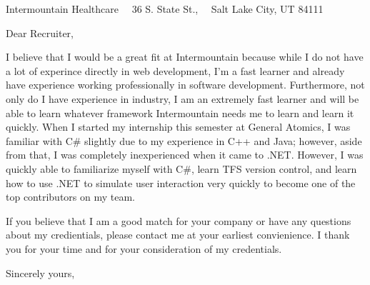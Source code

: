 \documentclass{scrlttr2}
\renewcommand{\\}{\ {\large\textperiodcentered}\ }
\begin{document}

\begin{letter}{ %
Intermountain Healthcare\\
36 S. State St.,\\
Salt Lake City, UT 84111
}


\opening{Dear Recruiter,} %

I believe that I would be a great fit at Intermountain because while I do not have a lot of experince directly in web development, I'm a fast learner and already have experience working professionally in software development.  Furthermore, not only do I have experience in industry, I am an extremely fast learner and will be able to learn whatever framework Intermountain needs me to learn and learn it quickly.  When I started my internship this semester at General Atomics, I was familiar with C\# slightly due to my experience in C++ and Java; however, aside from that, I was completely inexperienced when it came to .NET.  However, I was quickly able to familiarize myself with C\#, learn TFS version control, and learn how to use .NET to simulate user interaction very quickly to become one of the top contributors on my team.\\

If you believe that I am a good match for your company or have any questions about my credientials, please contact me at your earliest convienience.   I thank you for your time and for your consideration of my credentials. \\

Sincerely yours, \\ \\ \\


\end{letter}
\end{document}
